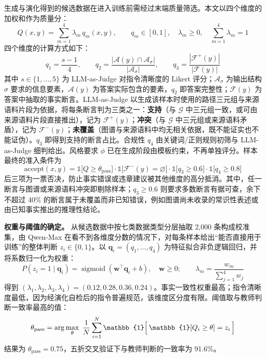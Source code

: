 \documentclass[fontset=fandol,type=master,campus=shenzhen,etitleauto=true]{hithesisbook}
\begin{document}
生成与演化得到的候选数据在进入训练前需经过末端质量筛选。本文以四个维度的加权和作为质量分：
\begin{equation}\label{eq:quality}
Q(x, y) = \sum_{m=1}^{4} \lambda_m\, q_m(x, y), \qquad q_m \in [0, 1], \quad \lambda_m \ge 0, \quad \sum_{m=1}^{4} \lambda_m = 1
\end{equation}
四个维度的计算方式如下：
\begin{equation}\label{eq:quality-dims}
q_1 = \frac{s - 1}{4}, \qquad
q_2 = \frac{|\mathcal{A}(y) \cap \mathcal{A}_\sigma|}{|\mathcal{A}_\sigma|}, \qquad
q_3 = \frac{|\mathcal{F}^{+}(y)|}{|\mathcal{F}(y)|}
\end{equation}
其中 $s \in \{1, \ldots, 5\}$ 为 LLM-as-Judge 对指令清晰度的 Likert 评分；$\mathcal{A}_\sigma$ 为输出结构 $\sigma$ 要求的信息要素，$\mathcal{A}(y)$ 为答案实际包含的要素，$q_2$ 即答案完整性；$\mathcal{F}(y)$ 为答案中抽取的事实断言。LLM-as-Judge 以生成该样本时使用的路径三元组与来源语料片段为依据，将每条断言判为三类之一：\textbf{支持}（与 $\mathcal{G}$ 中三元组一致，或可由来源语料片段直接推出），记为 $\mathcal{F}^{+}(y)$；\textbf{冲突}（与 $\mathcal{G}$ 中三元组或来源语料矛盾），记为 $\mathcal{F}^{-}(y)$；\textbf{未覆盖}（图谱与来源语料中均无相关依据，既不能证实也不能证伪）。$q_3$ 即得到支持的断言占比。合规性 $q_4$ 由关键词/正则规则初筛与 LLM-as-Judge 细判给出。风格要求 $\phi$ 已在生成阶段由模板约束，不再单独评分。样本最终的准入条件为
\begin{equation}\label{eq:accept}
\text{accept}(x, y) = \mathbb{1}\bigl[Q \ge \theta_{\text{pass}}\bigr] \cdot \mathbb{1}\bigl[\mathcal{F}^{-}(y) = \varnothing\bigr] \cdot \mathbb{1}\bigl[q_3 \ge 0.6\bigr] \cdot \mathbb{1}\bigl[q_4 \ge 0.8\bigr]
\end{equation}
后三项为一票否决，防止事实错误或违章建议被其他维度的高分抵消。其中，任一断言与图谱或来源语料冲突即剔除样本；$q_3 \ge 0.6$ 则要求多数断言有据可查，余下不超过 40\% 的断言属于未覆盖而非已知错误，例如图谱尚未收录的常识性表述或由已知事实推出的推理性结论。

\textbf{权重与阈值的确定。} 从候选数据中按七类数据类型分层抽取 2,000 条构成校准集，由 Qwen-Max 在看不到各维度分数的情况下，对每条样本给出“能否直接用于训练”的整体判断 $z_i \in \{0, 1\}$。以 $\mathbf{q}_i = (q_1, \ldots, q_4)$ 为特征拟合非负逻辑回归，并将系数归一化为权重：
\begin{equation}\label{eq:weight-calib}
P(z_i = 1 \mid \mathbf{q}_i) = \operatorname{sigmoid}(\mathbf{w}^\top \mathbf{q}_i + b), \quad \mathbf{w} \ge 0; \qquad
\lambda_m = \frac{w_m}{\sum_{j=1}^{4} w_j}
\end{equation}
得到 $(\lambda_1, \lambda_2, \lambda_3, \lambda_4) = (0.12, 0.28, 0.36, 0.24)$。事实一致性权重最高；指令清晰度最低，因为经演化自检后的指令普遍规范，该维度区分度有限。阈值取与教师判断一致率最高的值：
\begin{equation}\label{eq:theta-pass}
\theta_{\text{pass}} = \arg\max_{\theta} \; \frac{1}{N} \sum_{i=1}^{N} \mathbb{1}\Bigl[\, \mathbb{1}[Q_i \ge \theta] = z_i \,\Bigr]
\end{equation}
结果为 $\theta_{\text{pass}} = 0.75$，五折交叉验证下与教师判断的一致率为 91.6\%。
\end{document}
